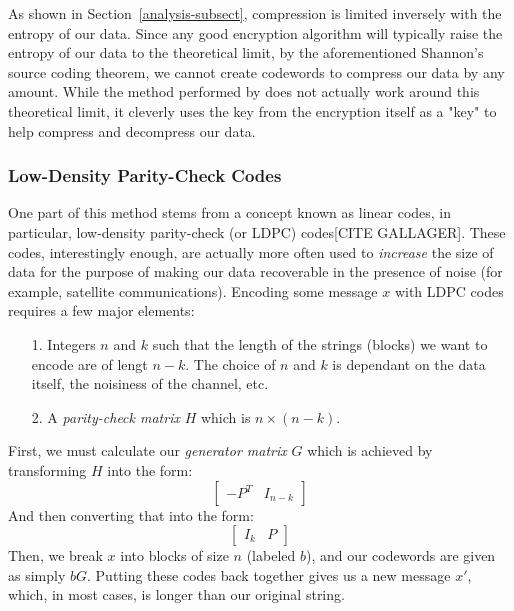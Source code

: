 \documentclass[11pt]{article}
\newcommand\genref{}
\newcommand\sectref{}
\def\genref#1#2{#1~\ref{#2}}
\def\sectref#1{\genref{Section}{#1}}
\begin{document}
As shown in \sectref{analysis-subsect}, compression is limited inversely with the entropy of our data. 
Since any good encryption algorithm will typically raise the entropy of our data to the theoretical limit, 
by the aforementioned Shannon's source coding theorem, we cannot create codewords to compress 
our data by any amount. While the method performed by \cite{johnson} does not actually work around 
this theoretical limit, it cleverly uses the key from the encryption itself as a "key" to help compress and 
decompress our data. 

\subsubsection{Low-Density Parity-Check Codes}\label{ldpc-subsubsect}
One part of this method stems from a concept known as linear codes, in particular, 
low-density parity-check (or LDPC) codes[CITE GALLAGER].
These codes, interestingly enough, are actually more often used to \emph{increase} the size of data for the purpose of 
making our data recoverable in the presence of noise (for example, satellite communications). 
Encoding some message $x$ with LDPC codes requires a few major elements: 
\begin{itemize}
	\item[1.]Integers $n$ and $k$ such that the length of the strings (blocks) we want to encode are of lengt $n-k$. 
The choice of $n$ and $k$ is dependant on the data itself, the noisiness of the channel, etc. 
	\item[2.]A \emph{parity-check matrix} $H$ which is $n\times (n-k)$.
\end{itemize}
First, we must calculate our \emph{generator matrix} $G$ which is achieved by transforming 
$H$ into the form:
\[ \left[
\begin{array}{c|c}
	-P^T & I_{n-k}
\end{array}
\right] \]
And then converting that into the form: 
\[ \left[
\begin{array}{c|c}
	I_k & P
\end{array}
\right] \]
Then, we break $x$ into blocks of size $n$ (labeled $b$), and our codewords are given as simply $bG$. 
Putting these codes back together gives us a new message $x'$, which, in most cases, is longer than 
our original string. 
\end{document}
